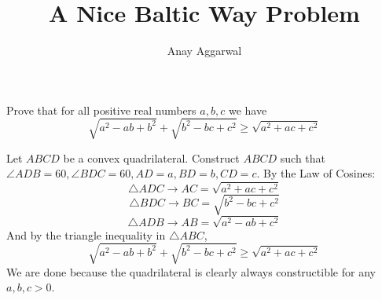 \documentclass{article}
\title{A Nice Baltic Way Problem}
\author{Anay Aggarwal}
\begin{document}
\maketitle

\begin{example}
  Prove that for all positive real numbers $a,b,c$ we have
  $$\sqrt{a^2-ab+b^2}+\sqrt{b^2-bc+c^2}\ge\sqrt{a^2+ac+c^2}$$
\end{example}

Let $ABCD$ be a convex quadrilateral. Construct $ABCD$ such that $\angle ADB=60, \angle BDC=60, AD=a, BD=b, CD=c$. By the Law of Cosines:
$$\triangle ADC\to AC=\sqrt{a^2+ac+c^2}$$
$$\triangle BDC\to BC=\sqrt{b^2-bc+c^2}$$
$$\triangle ADB\to AB=\sqrt{a^2-ab+c^2}$$
And by the triangle inequality in $\triangle ABC$,
$$\sqrt{a^2-ab+b^2}+\sqrt{b^2-bc+c^2}\ge\sqrt{a^2+ac+c^2}$$
We are done because the quadrilateral is clearly always constructible for any $a,b,c>0$.
\end{document}

